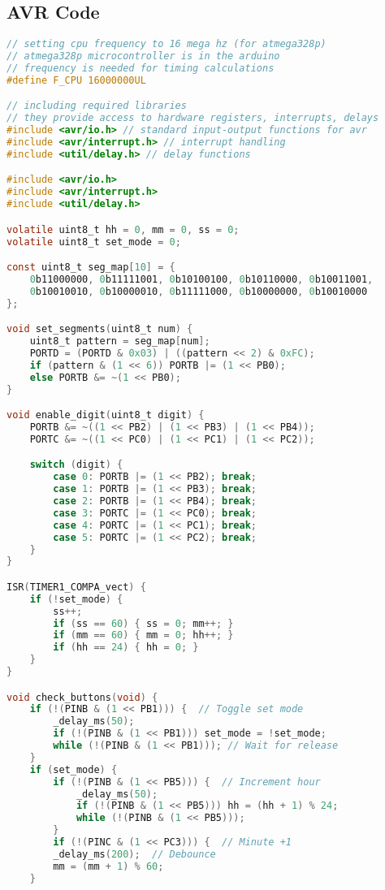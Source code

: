 \documentclass[journal]{IEEEtran}
\begin{document}
\subsection{AVR Code}
\begin{lstlisting}[language=C, basicstyle=\ttfamily, keywordstyle=\color{blue}, commentstyle=\color{green}]
// setting cpu frequency to 16 mega hz (for atmega328p)
// atmega328p microcontroller is in the arduino
// frequency is needed for timing calculations
#define F_CPU 16000000UL

// including required libraries
// they provide access to hardware registers, interrupts, delays
#include <avr/io.h> // standard input-output functions for avr
#include <avr/interrupt.h> // interrupt handling
#include <util/delay.h> // delay functions

#include <avr/io.h>
#include <avr/interrupt.h>
#include <util/delay.h>

volatile uint8_t hh = 0, mm = 0, ss = 0;
volatile uint8_t set_mode = 0;

const uint8_t seg_map[10] = {
    0b11000000, 0b11111001, 0b10100100, 0b10110000, 0b10011001,
    0b10010010, 0b10000010, 0b11111000, 0b10000000, 0b10010000
};

void set_segments(uint8_t num) {
    uint8_t pattern = seg_map[num];
    PORTD = (PORTD & 0x03) | ((pattern << 2) & 0xFC);
    if (pattern & (1 << 6)) PORTB |= (1 << PB0);
    else PORTB &= ~(1 << PB0);
}

void enable_digit(uint8_t digit) {
    PORTB &= ~((1 << PB2) | (1 << PB3) | (1 << PB4));
    PORTC &= ~((1 << PC0) | (1 << PC1) | (1 << PC2));

    switch (digit) {
        case 0: PORTB |= (1 << PB2); break;
        case 1: PORTB |= (1 << PB3); break;
        case 2: PORTB |= (1 << PB4); break;
        case 3: PORTC |= (1 << PC0); break;
        case 4: PORTC |= (1 << PC1); break;
        case 5: PORTC |= (1 << PC2); break;
    }
}

ISR(TIMER1_COMPA_vect) {
    if (!set_mode) {
        ss++;
        if (ss == 60) { ss = 0; mm++; }
        if (mm == 60) { mm = 0; hh++; }
        if (hh == 24) { hh = 0; }
    }
}

void check_buttons(void) {
    if (!(PINB & (1 << PB1))) {  // Toggle set mode
        _delay_ms(50);
        if (!(PINB & (1 << PB1))) set_mode = !set_mode;
        while (!(PINB & (1 << PB1))); // Wait for release
    }
    if (set_mode) {
        if (!(PINB & (1 << PB5))) {  // Increment hour
            _delay_ms(50);
            if (!(PINB & (1 << PB5))) hh = (hh + 1) % 24;
            while (!(PINB & (1 << PB5)));
        }
        if (!(PINC & (1 << PC3))) {  // Minute +1
        _delay_ms(200);  // Debounce
        mm = (mm + 1) % 60;
    }


\end{lstlisting}
\end{document}
